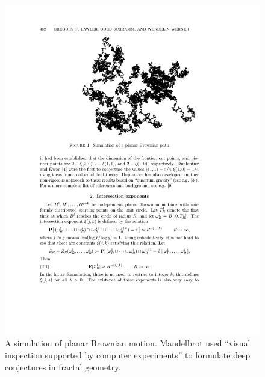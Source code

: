 \documentclass{llncs}
\begin{document}
\begin{figure}[h!]
  \centering
\includegraphics[scale=0.5]{brownian_motion.pdf}
  \caption{A simulation of planar Brownian motion. Mandelbrot used ``visual
inspection supported by computer experiments'' to formulate deep
conjectures in fractal geometry.}
\label{fig:4/3}
\end{figure}

%
%

\end{document}
